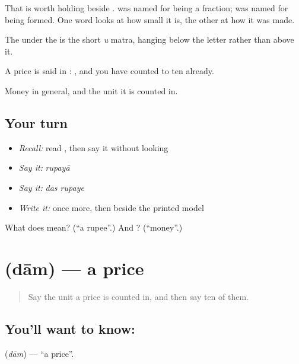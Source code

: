 That is worth holding beside .  was named for being a fraction;  was named for being formed. One word looks at how small it is, the other at how it was made.

The  under the  is the short \emph{u} matra, hanging below the letter rather than above it.

A price is said in : \textbf{ }, and you have counted to ten already.

\begin{grammarlens}[title={What you've built}]
Money in general, and the unit it is counted in.
\end{grammarlens}

\subsection*{Your turn}
\begin{itemize}
\raggedright
  \item \emph{Recall:} read \textbf{}, then say it without looking
  \item \emph{Say it:} \emph{rupayā}
  \item \emph{Say it:} \emph{das rupaye}
  \item \emph{Write it:}  once more, then  beside the printed model
\end{itemize}

\begin{tcolorbox}[breakable,colback=teal!4,colframe=teal!35!black,title={Before you move on}]
What does  mean? (\textquotedblleft{}a rupee\textquotedblright{}.) And ? (\textquotedblleft{}money\textquotedblright{}.)
\end{tcolorbox}
\section[dām]{ (dām) — a price}

\label{lesson:HI-C72-price}



\begin{quote}
Say the unit a price is counted in, and then say ten of them.
\end{quote}

\subsection*{You'll want to know: }
\textbf{} (\emph{dām}) — \textquotedblleft{}a price\textquotedblright{}.


